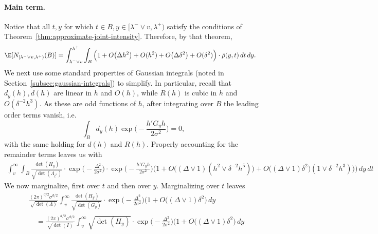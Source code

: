 \documentclass{article}
\newcommand{\ag}[1]{{\bf{{\red{[{AG: #1}]}}}}}
\begin{document}
	\paragraph{Main term.}
	Notice that all $t,y$ for which $t \in B, y \in [\lambda^{-} \vee v, \lambda^{+})$ satisfy the conditions of Theorem~\ref{thm:approximate-joint-intensity}.  Therefore, by that theorem,
	\begin{equation*}
		\begin{aligned}
			\E[N_{[\lambda^{-} \vee v, \lambda^{+})}(B)] & =  \int_{\lambda^{-} \vee v}^{\lambda^{+}} \int_{B} \Big(1 + O\big(\Delta h^2\big) + O(h^2) + O\big(\Delta\delta^2\big) + O(\delta^2)\Big) \cdot \bar{\rho}(y,t) \,dt \,dy.
		\end{aligned}
	\end{equation*}
	\ag{Pick back up...}
	We next use some standard properties of Gaussian integrals (noted in Section~\ref{subsec:gaussian-integrals}) to simplify. In particular, recall that $d_y(h),d(h)$ are linear in $h$ and $O(h)$, while $R(h)$ is cubic in $h$ and $O(\delta^{-2}h^3)$. As these are odd functions of $h$, after integrating over $B$ the leading order terms vanish, i.e.
	\begin{equation*}
		\int_{B} d_y(h) \exp\Big(-\frac{h'G_yh}{2\sigma^2}\Big) = 0,
	\end{equation*}
	with the same holding for $d(h)$ and $R(h)$. Properly accounting for the remainder terms leaves us with
	\begin{equation*}
		\begin{aligned}	
			\int_{v}^{\infty} \int_{B}  \frac{\det(H_y)}{\sqrt{\det(\Lambda_{t^*})}}\cdot\exp\Big(-\frac{\Delta^2}{2\sigma^2}\Big) \cdot \exp\bigg(-\frac{h' G_{y}h}{2\sigma^2}\bigg) \Big(1 + O\big((\Delta \vee 1)(h^2 \vee \delta^{-2}h^5)\big) + O\big((\Delta \vee 1)\delta^2\big)(1 \vee \delta^{-2}h^3)\Big)\Big) \,dy \,dt
		\end{aligned}
	\end{equation*}
	We now marginalize, first over $t$ and then over $y$. Marginalizing over $t$ leaves
	\begin{equation}
		\label{pf:approximate-joint-distribution-2}
		\begin{aligned}
			& \frac{(2\pi)^{d/2}\sigma^{d/2}}{\sqrt{\det(\Lambda)}}\int_{v}^{\infty} \frac{\det(H_y)}{\sqrt{\det(G_y)}} \cdot \exp\Big(-\frac{\Delta^2}{2\sigma^2}\Big) \Big(1 + O\big((\Delta \vee 1)\delta^2\Big) \,dy \\
			& \quad = \frac{(2\pi)^{d/2}\sigma^{d/2}}{\sqrt{\det(I)}}\int_{v}^{\infty} \sqrt{\det(H_y)} \cdot \exp\Big(-\frac{\Delta^2}{2\sigma^2}\Big) \Big(1 + O\big((\Delta \vee 1)\delta^2\Big) \,dy
		\end{aligned}
	\end{equation}
\end{document}
